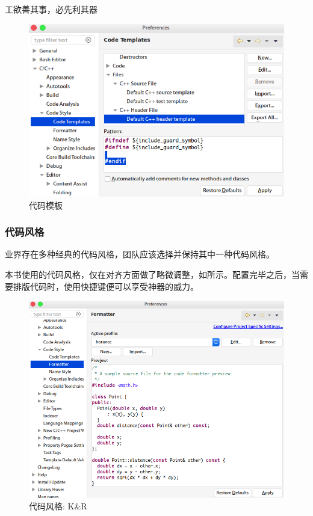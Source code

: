 \begin{content}
\begin{episode}{工欲善其事，必先利其器}
\begin{content}
\begin{figure}[H]
\centering
\includegraphics[width=1.0\textwidth]{figures/xunit/eclipse-code-template.png}
\caption{代码模板}
 \label{fig:eclipse-code-template}
\end{figure}

\subsubsection{代码风格}

业界存在多种经典的代码风格，团队应该选择并保持其中一种代码风格。

\begin{enum}
\end{enum}

本书使用的代码风格，仅在对齐方面做了略微调整，如所示。配置完毕之后，当需要排版代码时，使用快捷键便可以享受神器的威力。

\begin{figure}[H]
\centering
\includegraphics[width=1.0\textwidth]{figures/xunit/eclipse-formatter.png}
\caption{代码风格: K\&R}
 \label{fig:eclipse-formatter}
\end{figure}


\end{content}
\end{episode}
\end{content}
